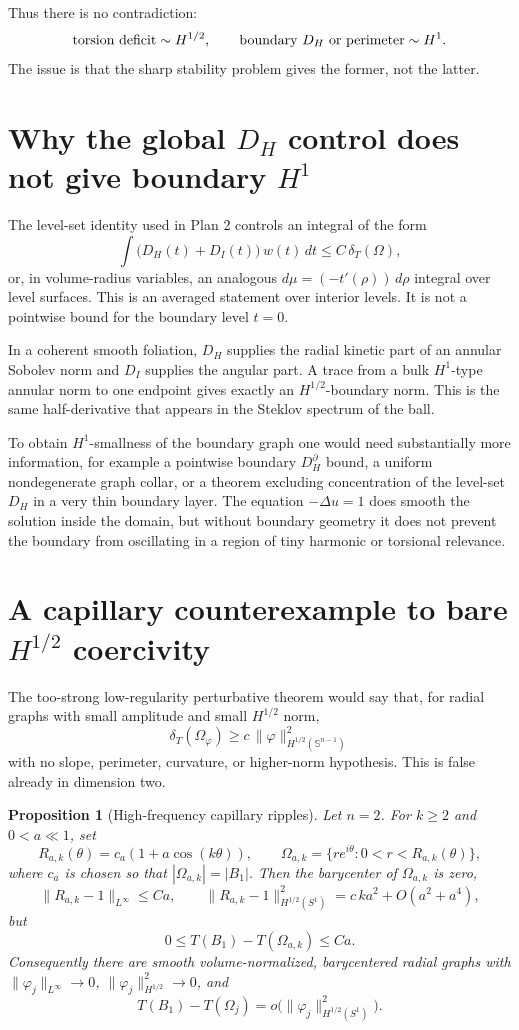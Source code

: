 \documentclass[11pt]{article}
\newtheorem{proposition}[theorem]{Proposition}
\newcommand{\Om}{\Omega}
\newcommand{\Sph}{\mathbb S^{n-1}}
\newcommand{\dT}{\delta_T}
\begin{document}
Thus there is no contradiction:
\[
   \hbox{torsion deficit}\sim H^{1/2},\qquad
   \hbox{boundary }D_H\hbox{ or perimeter}\sim H^1.
\]
The issue is that the sharp stability problem gives the former, not the latter.

\section{Why the global \(D_H\) control does not give boundary \(H^1\)}

The level-set identity used in Plan 2 controls an integral of the form
\[
   \int \bigl(D_H(t)+D_I(t)\bigr)\,w(t)\,dt
      \le C\,\dT(\Om),
\]
or, in volume-radius variables, an analogous \(d\mu=(-t'(\rho))\,d\rho\)
integral over level surfaces.  This is an averaged statement over interior
levels.  It is not a pointwise bound for the boundary level \(t=0\).

In a coherent smooth foliation, \(D_H\) supplies the radial kinetic part of an
annular Sobolev norm and \(D_I\) supplies the angular part.  A trace from a
bulk \(H^1\)-type annular norm to one endpoint gives exactly an
\(H^{1/2}\)-boundary norm.  This is the same half-derivative that appears in
the Steklov spectrum of the ball.

To obtain \(H^1\)-smallness of the boundary graph one would need substantially
more information, for example a pointwise boundary \(D_H^\partial\) bound, a
uniform nondegenerate graph collar, or a theorem excluding concentration of the
level-set \(D_H\) in a very thin boundary layer.  The equation
\(-\Delta u=1\) does smooth the solution inside the domain, but without
boundary geometry it does not prevent the boundary from oscillating in a
region of tiny harmonic or torsional relevance.

\section{A capillary counterexample to bare \(H^{1/2}\) coercivity}

The too-strong low-regularity perturbative theorem would say that, for radial
graphs with small amplitude and small \(H^{1/2}\) norm,
\[
   \dT(\Om_\varphi)\ge c\,\|\varphi\|_{H^{1/2}(\Sph)}^2
\]
with no slope, perimeter, curvature, or higher-norm hypothesis.  This is
false already in dimension two.

\begin{proposition}[High-frequency capillary ripples]\label{prop:capillary}
Let \(n=2\).  For \(k\ge2\) and \(0<a\ll1\), set
\[
   R_{a,k}(\theta)=c_a(1+a\cos(k\theta)),\qquad
   \Om_{a,k}=\{re^{i\theta}:0<r<R_{a,k}(\theta)\},
\]
where \(c_a\) is chosen so that \(|\Om_{a,k}|=|B_1|\).  Then the barycenter of
\(\Om_{a,k}\) is zero,
\[
   \|R_{a,k}-1\|_{L^\infty}\le C a,\qquad
   \|R_{a,k}-1\|_{H^{1/2}(S^1)}^2
      = c\,k a^2+O(a^2+a^4),
\]
but
\[
   0\le T(B_1)-T(\Om_{a,k})\le C a .
\]
Consequently there are smooth volume-normalized, barycentered radial graphs
with \(\|\varphi_j\|_{L^\infty}\to0\),
\(\|\varphi_j\|_{H^{1/2}}^2\to0\), and
\[
   T(B_1)-T(\Om_j)
      =o\bigl(\|\varphi_j\|_{H^{1/2}(S^1)}^2\bigr).
\]
\end{proposition}
\end{document}
